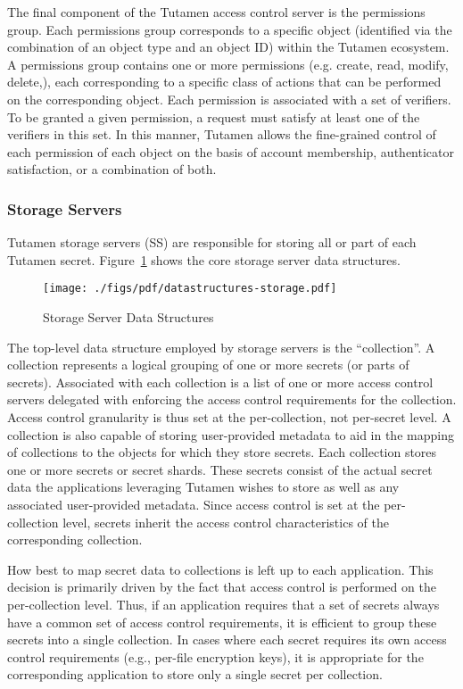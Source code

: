 The final component of the Tutamen access control server is the
permissions group. Each permissions group corresponds to a specific
object (identified via the combination of an object type and an object
ID) within the Tutamen ecosystem. A permissions group contains one or
more permissions (e.g. create, read, modify, delete,), each
corresponding to a specific class of actions that can be performed on
the corresponding object. Each permission is associated with a set of
verifiers. To be granted a given permission, a request must satisfy at
least one of the verifiers in this set. In this manner, Tutamen allows
the fine-grained control of each permission of each object on the
basis of account membership, authenticator satisfaction, or a
combination of both.

\subsubsection{Storage Servers}
\label{sec:tutamen:arch:ss}

Tutamen storage servers (SS) are responsible for storing all or part
of each Tutamen secret. Figure~\ref{fig:tutamen:storagestructs} shows
the core storage server data structures.

\begin{figure}[th]
  \centering
  \texttt{[image: ./figs/pdf/datastructures-storage.pdf]}
  \caption{Storage Server Data Structures}
  \label{fig:tutamen:storagestructs}
\end{figure}

The top-level data structure employed by storage servers is the
``collection''. A collection represents a logical grouping of one or
more secrets (or parts of secrets). Associated with each collection is
a list of one or more access control servers delegated with enforcing
the access control requirements for the collection. Access control
granularity is thus set at the per-collection, not per-secret level. A
collection is also capable of storing user-provided metadata to aid in
the mapping of collections to the objects for which they store
secrets. Each collection stores one or more secrets or secret
shards. These secrets consist of the actual secret data the
applications leveraging Tutamen wishes to store as well as any
associated user-provided metadata. Since access control is set at the
per-collection level, secrets inherit the access control
characteristics of the corresponding collection.

How best to map secret data to collections is left up to each
application. This decision is primarily driven by the fact that access
control is performed on the per-collection level. Thus, if an
application requires that a set of secrets always have a common set of
access control requirements, it is efficient to group these secrets
into a single collection.  In cases where each secret requires its own
access control requirements (e.g., per-file encryption keys), it is
appropriate for the corresponding application to store only a single
secret per collection.

